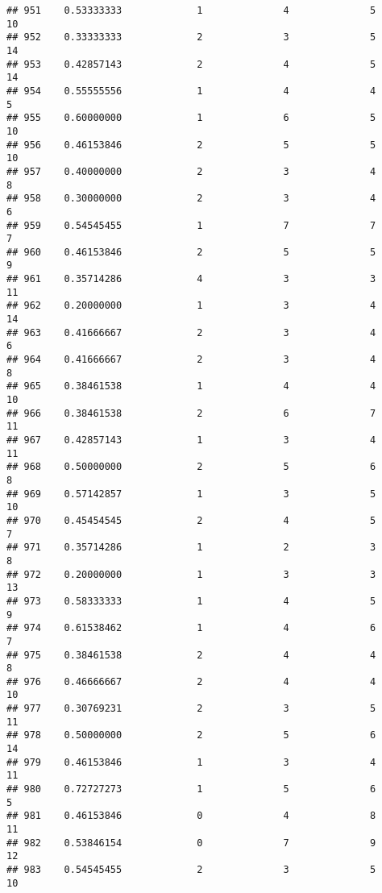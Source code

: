 \documentclass[
]{article}
\begin{document}
\begin{verbatim}
## 951    0.53333333             1              4              5             10
## 952    0.33333333             2              3              5             14
## 953    0.42857143             2              4              5             14
## 954    0.55555556             1              4              4              5
## 955    0.60000000             1              6              5             10
## 956    0.46153846             2              5              5             10
## 957    0.40000000             2              3              4              8
## 958    0.30000000             2              3              4              6
## 959    0.54545455             1              7              7              7
## 960    0.46153846             2              5              5              9
## 961    0.35714286             4              3              3             11
## 962    0.20000000             1              3              4             14
## 963    0.41666667             2              3              4              6
## 964    0.41666667             2              3              4              8
## 965    0.38461538             1              4              4             10
## 966    0.38461538             2              6              7             11
## 967    0.42857143             1              3              4             11
## 968    0.50000000             2              5              6              8
## 969    0.57142857             1              3              5             10
## 970    0.45454545             2              4              5              7
## 971    0.35714286             1              2              3              8
## 972    0.20000000             1              3              3             13
## 973    0.58333333             1              4              5              9
## 974    0.61538462             1              4              6              7
## 975    0.38461538             2              4              4              8
## 976    0.46666667             2              4              4             10
## 977    0.30769231             2              3              5             11
## 978    0.50000000             2              5              6             14
## 979    0.46153846             1              3              4             11
## 980    0.72727273             1              5              6              5
## 981    0.46153846             0              4              8             11
## 982    0.53846154             0              7              9             12
## 983    0.54545455             2              3              5             10

\end{verbatim}
\end{document}
